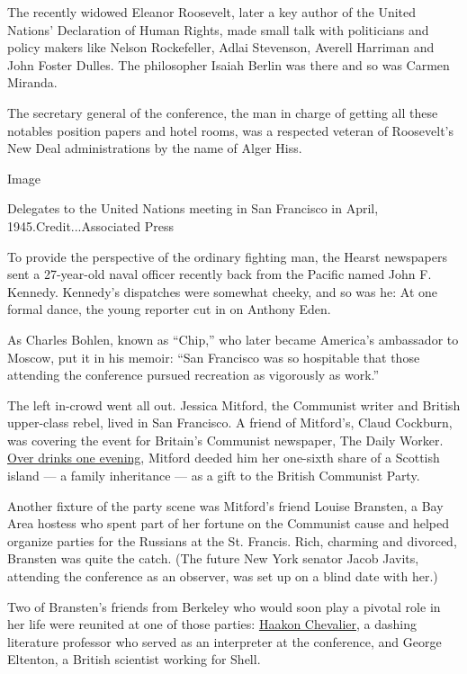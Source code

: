 The recently widowed Eleanor Roosevelt, later a key author of the United
Nations' Declaration of Human Rights, made small talk with politicians
and policy makers like Nelson Rockefeller, Adlai Stevenson, Averell
Harriman and John Foster Dulles. The philosopher Isaiah Berlin was there
and so was Carmen Miranda.

The secretary general of the conference, the man in charge of getting
all these notables position papers and hotel rooms, was a respected
veteran of Roosevelt's New Deal administrations by the name of Alger
Hiss.

Image

Delegates to the United Nations meeting in San Francisco in April,
1945.Credit...Associated Press

To provide the perspective of the ordinary fighting man, the Hearst
newspapers sent a 27-year-old naval officer recently back from the
Pacific named John F. Kennedy. Kennedy's dispatches were somewhat
cheeky, and so was he: At one formal dance, the young reporter cut in on
Anthony Eden.

As Charles Bohlen, known as ``Chip,'' who later became America's
ambassador to Moscow, put it in his memoir: ``San Francisco was so
hospitable that those attending the conference pursued recreation as
vigorously as work.''

The left in-crowd went all out. Jessica Mitford, the Communist writer
and British upper-class rebel, lived in San Francisco. A friend of
Mitford's, Claud Cockburn, was covering the event for Britain's
Communist newspaper, The Daily Worker.
\href{http://www.nytimes3xbfgragh.onion/1977/04/17/archives/memoirs-of-a-notsodutiful-daughter-they-were-an-unlikely-couple-in.html?mcubz=0\&_r=0}{Over
drinks one evening}, Mitford deeded him her one-sixth share of a
Scottish island --- a family inheritance --- as a gift to the British
Communist Party.

Another fixture of the party scene was Mitford's friend Louise Bransten,
a Bay Area hostess who spent part of her fortune on the Communist cause
and helped organize parties for the Russians at the St. Francis. Rich,
charming and divorced, Bransten was quite the catch. (The future New
York senator Jacob Javits, attending the conference as an observer, was
set up on a blind date with her.)

Two of Bransten's friends from Berkeley who would soon play a pivotal
role in her life were reunited at one of those parties:
\href{http://www.nytimes3xbfgragh.onion/1985/07/11/us/haakon-chevalier-83-author-and-translator.html?mcubz=0}{Haakon
Chevalier}, a dashing literature professor who served as an interpreter
at the conference, and George Eltenton, a British scientist working for
Shell.

